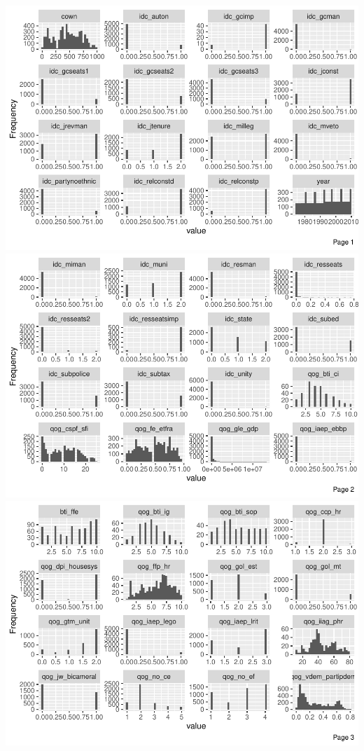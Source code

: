 \documentclass[
]{article}
\begin{document}
\includegraphics{01_tjbrailey_wrangle_data_files/figure-latex/unnamed-chunk-19-1.pdf}
\includegraphics{01_tjbrailey_wrangle_data_files/figure-latex/unnamed-chunk-19-2.pdf}
\includegraphics{01_tjbrailey_wrangle_data_files/figure-latex/unnamed-chunk-19-3.pdf}
\end{document}

